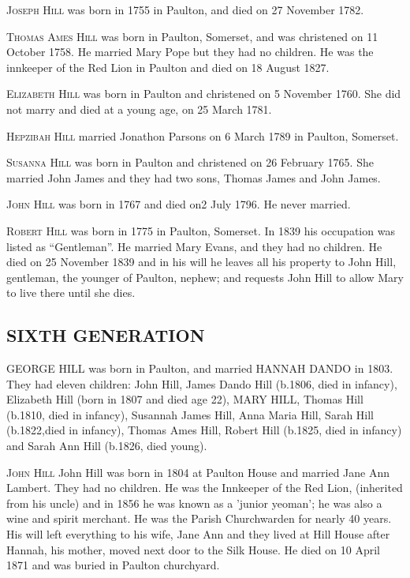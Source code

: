 \textsc{Joseph Hill} was born in 1755 in Paulton, and died on 27 November 1782.

\textsc{Thomas Ames Hill} was born in Paulton, Somerset, and was christened on 11 October 1758. He married Mary Pope but they had no children. He was the innkeeper of the Red Lion in Paulton and died on 18 August 1827.

\textsc{Elizabeth Hill} was born in Paulton and christened on 5 November 1760. She did not marry and died at a young age, on  25 March 1781.

\textsc{Hepzibah Hill} married Jonathon Parsons on 6 March 1789 in Paulton, Somerset.

\textsc{Susanna Hill} was born in Paulton and christened on 26 February 1765. She married John James and they had two sons, Thomas James and John James.

\textsc{John Hill} was born in 1767 and died on2 July 1796. He never married.

\textsc{Robert Hill} was born in 1775 in Paulton, Somerset. In 1839 his occupation was listed as ``Gentleman''. He married Mary Evans, and they had no children. He died on 25 November 1839 and in his will he leaves all his property to John Hill, gentleman, the younger of Paulton, nephew; and requests John Hill to allow Mary to live there until she dies.

\subsection{SIXTH GENERATION}

\uppercase{George Hill} was born in Paulton, and married \uppercase{Hannah Dando} in 1803. They had eleven children: John Hill, James Dando Hill (b.1806, died in infancy), Elizabeth Hill (born in 1807 and died age 22), \uppercase{Mary Hill}, Thomas Hill (b.1810, died in infancy), Susannah James Hill, Anna Maria Hill, Sarah Hill (b.1822,died in infancy), Thomas Ames Hill, Robert Hill (b.1825, died in infancy) and Sarah Ann Hill (b.1826, died young). 

\textsc{John Hill} John Hill was born in 1804 at Paulton House and married Jane Ann Lambert. They had no children. He was the Innkeeper of the Red Lion, (inherited from his uncle) and in 1856 he was known as a 'junior yeoman'; he was also a wine and spirit merchant. He was the Parish Churchwarden for nearly 40 years. His will left everything to his wife, Jane Ann and they lived at Hill House after Hannah, his mother, moved next door to the Silk House. He died on 10 April 1871 and was buried in Paulton churchyard.

